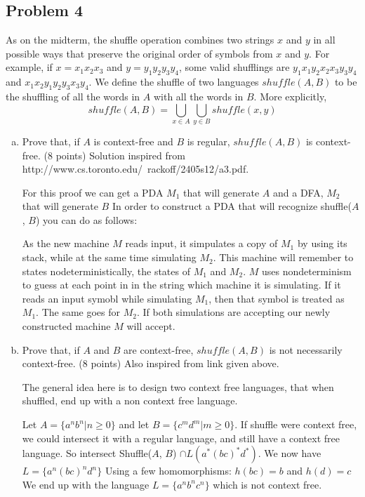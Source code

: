 \documentclass{article}
\begin{document}
            \subsection*{Problem 4}
            As on the midterm, the shuffle operation combines two strings $x$ and $y$ in all possible
            ways that preserve the original order of symbols from $x$ and $y$.  For example, if
            $x=x_1x_2x_3$ and $y=y_1y_2y_3y_4$, some valid shufflings are $y_1x_1y_2x_2x_3y_3y_4$ and
            $x_1x_2y_1y_2y_3x_3y_4$.  We define the shuffle of two languages $shuffle(A,B)$ to be the
            shuffling of all the words in $A$ with all the words in $B$.  More explicitly,
            \[shuffle(A,B)=\bigcup\limits_{x \in A}\bigcup\limits_{y \in B} shuffle(x,y)\]
            \begin{enumerate}[(a)]
    \item Prove that, if $A$ is context-free and $B$ is regular, $shuffle(A,B)$ is
context-free. (8 points) Solution inspired from http://www.cs.toronto.edu/~rackoff/2405s12/a3.pdf.

    For this proof we can get a PDA $M_1$ that will generate $A$ and a DFA, $M_2$ that will generate $B$
    In order to construct a PDA that will recognize shuffle($A$, $B$) you can do as follows:

    As the new machine $M$ reads input, it simpulates a copy of $M_1$ by using its stack, while at the same
    time simulating $M_2$. This machine will remember to states nodeterministically, the states of $M_1$ and
    $M_2$. $M$ uses nondeterminism to guess at each point in in the string which machine it is simulating. If
    it reads an input symobl while simulating $M_1$, then that symbol is treated as $M_1$. The same goes for $M_2$.
    If both simulations are accepting our newly constructed machine $M$ will accept.

    \item Prove that, if $A$ and $B$ are context-free, $shuffle(A,B)$ is not necessarily
context-free. (8 points) Also inspired from link given above.

    The general idea here is to design two context free languages, that when shuffled, end up with a non 
    context free language.

    Let $A = \{a^nb^n | n \geq 0\}$ and let $B = \{c^md^m | m \geq 0\}$. If shuffle were context free,
    we could intersect it with a regular language, and still have a context free language.
    So intersect Shuffle($A$, $B$) $\cap L(a^*(bc)^*d^*)$. We now have $L = \{a^n(bc)^nd^n\}$ Using a few
    homomorphisms: $h(bc) = b$ and $h(d) = c$ We end up with the language $L = \{a^nb^nc^n\}$ which is not
    context free.


\end{enumerate}
\end{document}
